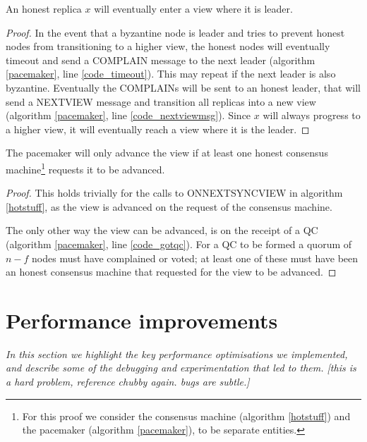 \begin{lemma} \label{progressionlemma}
	An honest replica $x$ will eventually enter a view where it is leader.
\end{lemma}

\begin{proof}
	In the event that a byzantine node is leader and tries to prevent honest nodes from transitioning to a higher view, the honest nodes will eventually timeout and send a COMPLAIN message to the next leader (algorithm \ref{pacemaker}, line \ref{code_timeout}). This may repeat if the next leader is also byzantine. Eventually the COMPLAINs will be sent to an honest leader, that will send a NEXT{\large V}IEW message and transition all replicas into a new view (algorithm \ref{pacemaker}, line \ref{code_nextviewmsg}). Since $x$ will always progress to a higher view, it will eventually reach a view where it is the leader.
\end{proof}

\begin{theorem} \label{syncvalid}
	The pacemaker will only advance the view if at least one honest consensus machine\footnote{For this proof we consider the consensus machine (algorithm \ref{hotstuff}) and the pacemaker (algorithm \ref{pacemaker}), to be separate entities.} requests it to be advanced.
\end{theorem}

\begin{proof}
	This holds trivially for the calls to ON{\large N}EXT{\large S}YNC{\large V}IEW in algorithm \ref{hotstuff}, as the view is advanced on the request of the consensus machine.

	The only other way the view can be advanced, is on the receipt of a QC (algorithm \ref{pacemaker}, line \ref{code_gotqc}). For a QC to be formed a quorum of $n - f$ nodes must have complained or voted; at least one of these must have been an honest consensus machine that requested for the view to be advanced.
\end{proof}

\section{Performance improvements} \label{performance}

\textit{In this section we highlight the key performance optimisations we implemented, and describe some of the debugging and experimentation that led to them. [this is a hard problem, reference chubby again. bugs are subtle.]}


